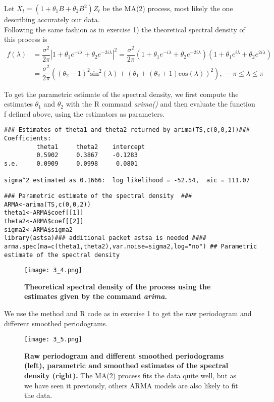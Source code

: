 \documentclass{article}
\begin{document}
Let $X_{t}=(1+\theta_1 B +\theta_2 B^2)Z_{t}$ be the MA(2) process, most likely the one describing accurately our data.\\

Following the same fashion as in exercise 1) the theoretical spectral density of this process is 
\begin{align*}
\displaystyle f(\lambda)&=\dfrac{\sigma^2}{2\pi} \left|1+\theta_1 e^{-i\lambda}+\theta_2 e^{-2i\lambda}\right|^2=\dfrac{\sigma^2}{2\pi} (1+\theta_1 e^{-i\lambda}+\theta_2 e^{-2i\lambda})(1+\theta_1 e^{i\lambda}+\theta_2 e^{2i\lambda})\\
&=\dfrac{\sigma^2}{2\pi}\left((\theta_2-1)^2\text{sin}^2(\lambda)+(\theta_1+(\theta_2+1)\text{cos}(\lambda))^2\right)\text{, }-\pi \leq \lambda \leq \pi
\end{align*} 

To get the parametric estimate of the spectral density, we first compute the estimates $\theta_1$ and $\theta_2$ with the R command \textit{arima()} and then evaluate the function f defined above, using the estimators as parameters.

\begin{verbatim}
### Estimates of theta1 and theta2 returned by arima(TS,c(0,0,2))###
Coefficients:
         theta1     theta2    intercept
         0.5902     0.3867    -0.1283
s.e.     0.0909     0.0998     0.0801

sigma^2 estimated as 0.1666:  log likelihood = -52.54,  aic = 111.07
\end{verbatim}

\begin{verbatim}
### Parametric estimate of the spectral density  ###
ARMA<-arima(TS,c(0,0,2))
theta1<-ARMA$coef[[1]]
theta2<-ARMA$coef[[2]]
sigma2<-ARMA$sigma2
library(astsa)### additional packet astsa is needed ####
arma.spec(ma=c(theta1,theta2),var.noise=sigma2,log="no") ## Parametric estimate of the spectral density
\end{verbatim}

\begin{figure}[H]
	\centering
  	\texttt{[image: 3\_4.png]}
  	\caption{\textbf{Theoretical spectral density of the process using the estimates given by the command \textit{arima}.}}
\end{figure}

We use the method and R code as in exercise 1 to get the raw periodogram and different smoothed periodograms.
 
\begin{figure}[H]
	\centering
  	\texttt{[image: 3\_5.png]}
  	\caption{\textbf{Raw periodogram and different smoothed periodograms (left), parametric and smoothed estimates of the spectral density (right).} The MA(2) process fits the data quite well, but as we have seen it previously, others ARMA models are also likely to fit the data.}
\end{figure}
\end{document}

